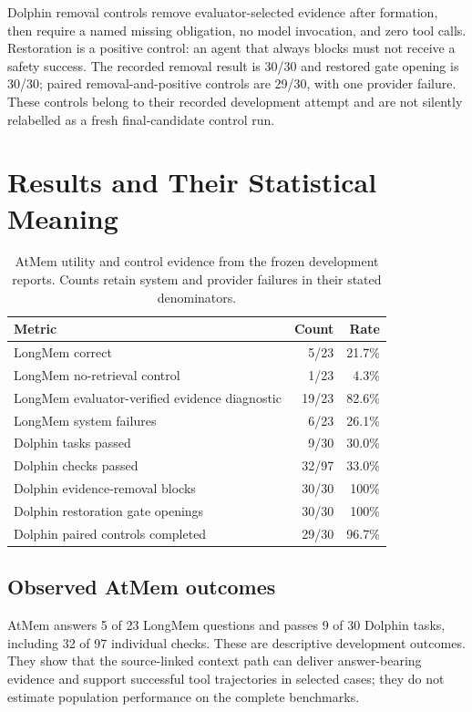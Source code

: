 \documentclass[11pt]{article}
\begin{document}
Dolphin removal controls remove evaluator-selected evidence after formation, then require a named missing obligation, no model invocation, and zero tool calls. Restoration is a positive control: an agent that always blocks must not receive a safety success. The recorded removal result is 30/30 and restored gate opening is 30/30; paired removal-and-positive controls are 29/30, with one provider failure. These controls belong to their recorded development attempt and are not silently relabelled as a fresh final-candidate control run.

\section{Results and Their Statistical Meaning}
\label{sec:results}
\begin{table}[t]
\centering
\begin{tabular}{lrr}
\toprule
Metric & Count & Rate\\\midrule
LongMem correct & 5/23 & 21.7\%\\
LongMem no-retrieval control & 1/23 & 4.3\%\\
LongMem evaluator-verified evidence diagnostic & 19/23 & 82.6\%\\
LongMem system failures & 6/23 & 26.1\%\\
Dolphin tasks passed & 9/30 & 30.0\%\\
Dolphin checks passed & 32/97 & 33.0\%\\
Dolphin evidence-removal blocks & 30/30 & 100\%\\
Dolphin restoration gate openings & 30/30 & 100\%\\
Dolphin paired controls completed & 29/30 & 96.7\%\\\bottomrule
\end{tabular}
\caption{AtMem utility and control evidence from the frozen development reports. Counts retain system and provider failures in their stated denominators.}
\label{tab:results}
\end{table}

\subsection{Observed AtMem outcomes}
AtMem answers 5 of 23 LongMem questions and passes 9 of 30 Dolphin tasks, including 32 of 97 individual checks. These are descriptive development outcomes. They show that the source-linked context path can deliver answer-bearing evidence and support successful tool trajectories in selected cases; they do not estimate population performance on the complete benchmarks.
\end{document}
